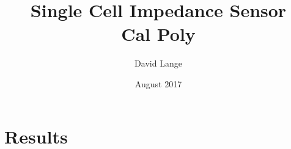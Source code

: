 \documentclass[12pt]{report}
\title{
        {Single Cell Impedance Sensor}\\
        {\large Cal Poly}
}
\author{David Lange}
\date{August 2017}
\begin{document}


%

%

%

\tableofcontents

\listoffigures

\listoftables

\doublespacing

%
\newpage
{}





%

%

%


%

\chapter{Results}

\end{document}

